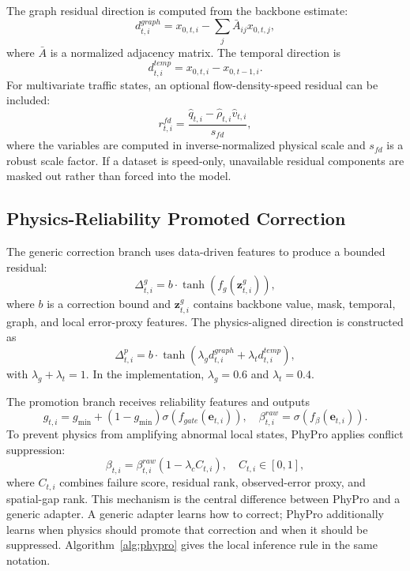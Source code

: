 \documentclass[preprint,12pt]{elsarticle}
\begin{document}
The graph residual direction is computed from the backbone estimate:
\begin{equation}
  d^{graph}_{t,i}
  =
  x_{0,t,i}
  -
  \sum_{j}\bar{A}_{ij}x_{0,t,j},
\end{equation}
where $\bar{A}$ is a normalized adjacency matrix. The temporal direction is
\begin{equation}
  d^{temp}_{t,i}
  =
  x_{0,t,i}-x_{0,t-1,i}.
\end{equation}
For multivariate traffic states, an optional flow-density-speed residual can be included:
\begin{equation}
  r^{fd}_{t,i}
  =
  \frac{\hat{q}_{t,i}-\hat{\rho}_{t,i}\hat{v}_{t,i}}{s_{fd}},
\end{equation}
where the variables are computed in inverse-normalized physical scale and $s_{fd}$ is a robust scale factor. If a dataset is speed-only, unavailable residual components are masked out rather than forced into the model.

\subsection{Physics-Reliability Promoted Correction}
The generic correction branch uses data-driven features to produce a bounded residual:
\begin{equation}
  \Delta^{g}_{t,i}
  =
  b\cdot \tanh\left(f_g(\mathbf{z}^{g}_{t,i})\right),
\end{equation}
where $b$ is a correction bound and $\mathbf{z}^{g}_{t,i}$ contains backbone value, mask, temporal, graph, and local error-proxy features. The physics-aligned direction is constructed as
\begin{equation}
  \Delta^{p}_{t,i}
  =
  b\cdot \tanh\left(
  \lambda_g d^{graph}_{t,i}
  +
  \lambda_t d^{temp}_{t,i}
  \right),
\end{equation}
with $\lambda_g+\lambda_t=1$. In the implementation, $\lambda_g=0.6$ and $\lambda_t=0.4$.

The promotion branch receives reliability features and outputs
\begin{equation}
  g_{t,i}=g_{\min}+(1-g_{\min})\sigma(f_{gate}(\mathbf{e}_{t,i})),
  \quad
  \beta^{raw}_{t,i}=\sigma(f_{\beta}(\mathbf{e}_{t,i})).
\end{equation}
To prevent physics from amplifying abnormal local states, PhyPro applies conflict suppression:
\begin{equation}
  \beta_{t,i}
  =
  \beta^{raw}_{t,i}
  \left(1-\lambda_c C_{t,i}\right),
  \quad
  C_{t,i}\in[0,1],
\end{equation}
where $C_{t,i}$ combines failure score, residual rank, observed-error proxy, and spatial-gap rank. This mechanism is the central difference between PhyPro and a generic adapter. A generic adapter learns how to correct; PhyPro additionally learns when physics should promote that correction and when it should be suppressed. Algorithm~\ref{alg:phypro} gives the local inference rule in the same notation.
\end{document}
